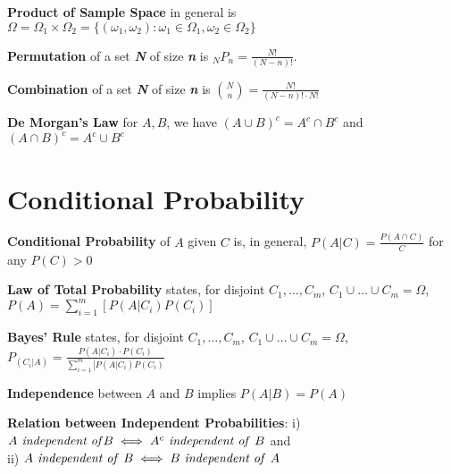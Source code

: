 \documentclass[5pt]{article}
\begin{document}
\begin{definition}
\textbf{Product of Sample Space} in general is $\Omega = \Omega_1 \times \Omega_2 = \{(\omega_1, \omega_2): \omega_1 \in \Omega_1, \omega_2 \in \Omega_2\}$
\end{definition}

\begin{definition}
\textbf{Permutation} of a set \textbf{\emph{N}} of size \textbf{\emph{n}} is $_NP_n = \frac{N!}{(N-n)!}$.
\end{definition}

\begin{definition}
\textbf{Combination} of a set \textbf{\emph{N}} of size \textbf{\emph{n}} is ${N \choose n} = \frac{N!}{(N-n)! \cdot N!}$
\end{definition}

\begin{definition}
\textbf{De Morgan's Law} for $A, B$, we have $(A\cup B)^c = A^c \cap B^c$ and $(A\cap B)^c = A^c \cup B^c$
\end{definition}


\section{Conditional Probability}
\begin{definition}
\textbf{Conditional Probability} of $A$ given $C$ is, in general, $P(A|C) = \frac{P(A\cap C)}{C}$ for any $P(C)>0$
\end{definition}

\begin{definition}
\textbf{Law of Total Probability} states, for disjoint $C_1,\dots,C_m$, $C_1 \cup \dots \cup C_m = \Omega$, $P(A) = \sum^m_{i=1} [P(A|C_i)P(C_i)]$
\end{definition}

\begin{definition}
\textbf{Bayes' Rule} states, for disjoint $C_1,\dots,C_m$, $C_1 \cup \dots \cup C_m=\Omega$, $P_(C_i|A) = \frac{P(A|C_i)\cdot P(C_i)}{\sum^m_{i=1}[P(A|C_i)P(C_i)}$
\end{definition}

\begin{definition}
\textbf{Independence} between $A$ and $B$ implies $P(A|B) = P(A)$
\end{definition} 

\begin{definition}
\textbf{Relation between Independent Probabilities}: i) $A \text{\emph{ independent of}} B \iff A^c \text{\emph{ independent of }}B$ and \\
ii) $A \text{\emph{ independent of }}B \iff B\text{\emph{ independent of }}A$
\end{definition}
\end{document}
